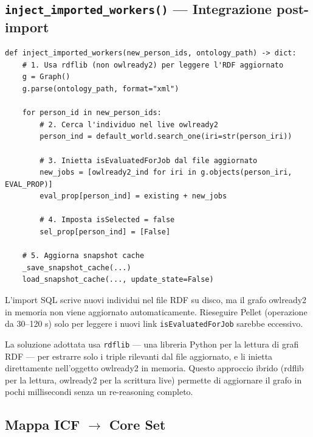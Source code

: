 \documentclass[a4paper,12pt]{article}
\begin{document}
\subsection{\texttt{inject\_imported\_workers()} --- Integrazione post-import}

\begin{lstlisting}[caption={Flusso di \texttt{inject\_imported\_workers()}.}]
def inject_imported_workers(new_person_ids, ontology_path) -> dict:
    # 1. Usa rdflib (non owlready2) per leggere l'RDF aggiornato
    g = Graph()
    g.parse(ontology_path, format="xml")

    for person_id in new_person_ids:
        # 2. Cerca l'individuo nel live owlready2
        person_ind = default_world.search_one(iri=str(person_iri))

        # 3. Inietta isEvaluatedForJob dal file aggiornato
        new_jobs = [owlready2_ind for iri in g.objects(person_iri, EVAL_PROP)]
        eval_prop[person_ind] = existing + new_jobs

        # 4. Imposta isSelected = false
        sel_prop[person_ind] = [False]

    # 5. Aggiorna snapshot cache
    _save_snapshot_cache(...)
    load_snapshot_cache(..., update_state=False)
\end{lstlisting}

\noindent \begin{infobox}
L'import SQL scrive nuovi individui nel file RDF su disco, ma il grafo
owlready2 in memoria non viene aggiornato automaticamente. Rieseguire
Pellet (operazione da 30--120 s) solo per leggere i nuovi link
\texttt{isEvaluatedForJob} sarebbe eccessivo.

La soluzione adottata usa \texttt{rdflib} --- una libreria Python per
la lettura di grafi RDF --- per estrarre solo i triple rilevanti dal
file aggiornato, e li inietta direttamente nell'oggetto owlready2 in
memoria. Questo approccio ibrido (rdflib per la lettura, owlready2 per
la scrittura live) permette di aggiornare il grafo in pochi millisecondi
senza un re-reasoning completo.
\end{infobox}

\subsection{Mappa ICF $\rightarrow$ Core Set}
\end{document}
